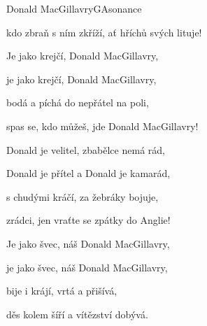 \begin{song}{Donald MacGillavry}{G}{Asonance}
\begin{SBChorus}
kdo zbraň s ním zkříží, ať hříchů svých lituje!

\end{SBChorus}

\begin{SBVerse}

Je jako krejčí, Donald MacGillavry,

je jako krejčí, Donald MacGillavry,

bodá a píchá do nepřátel na poli,

spas se, kdo můžeš, jde Donald MacGillavry!

\end{SBVerse}

\begin{SBChorus}

Donald je velitel, zbabělce nemá rád,

Donald je přítel a Donald je kamarád,

s chudými kráčí, za žebráky bojuje,

zrádci, jen vraťte se zpátky do Anglie!

\end{SBChorus}

\begin{SBVerse}

Je jako švec, náš Donald MacGillavry,

je jako švec, náš Donald MacGillavry,

bije i krájí, vrtá a přišívá,

děs kolem šíří a vítězství dobývá.

\end{SBVerse}

\end{song}

\clearpage
